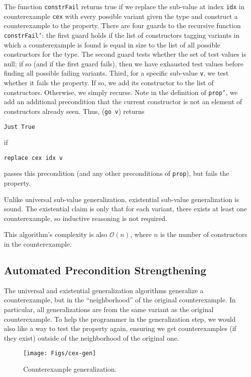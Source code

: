\documentclass{sigplanconf}
\newenvironment{code}{\begin{alltt}}{\end{alltt}}
\newcommand{\ttp}[1]{\texttt{#1}}
\begin{document}
The function \ttp{constrFail} returns true if we replace the sub-value at index
\ttp{idx} in counterexample \ttp{cex} with every possible variant given the type
and construct a counterexample to the property.  There are four guards to the
recursive function \ttp{constrFail'}: the first guard holds if the list of
constructors tagging variants in which a counterexample is found is equal in
size to the list of all possible constructors for the type.  The second guard
tests whether the set of test values is null; if so (and if the first guard
fails), then we have exhausted test values before finding all possible failing
variants.  Third, for a specific sub-value \ttp{v}, we test whether it fails the
property.  If so, we add its constructor to the list of constructors.
Otherwise, we simply recurse.  Note in the definition of \ttp{prop'}, we add an
additional precondition that the current constructor is not an element of
constructors already seen.  Thus, (\ttp{go v}) returns
%
\begin{code}
\ttp{Just True}
\end{code}
%
\noindent
if
%
\begin{code}
\ttp{replace cex idx v}
\end{code}
%
passes this precondition (and any other preconditions of \ttp{prop}), but fails
the property.

Unlike universal sub-value generalization, existential sub-value generalization
is sound.  The existential claim is only that for each variant, there exists at
least one counterexample, so inductive reasoning is not required.

This algorithm's complexity is also $\mathcal{O}(n)$, where $n$ is the number of
constructors in the counterexample.

\subsection{Automated Precondition Strengthening}\label{sec:precondition}
The universal and existential generalization algorithms generalize a
counterexample, but in the ``neighborhood'' of the original counterexample.  In
particular, all generalizations are from the same variant as the original
counterexample.  To help the programmer in the generalization step, we would
also like a way to test the property again, ensuring we get counterexamples (if
they exist) outside of the neighborhood of the original one.

\begin{figure}[ht!]
  \begin{center}
    \texttt{[image: Figs/cex-gen]}
   \end{center}
  \caption{Counterexample generalization.}
  \label{fig:cex-gen}
\end{figure}
\end{document}
